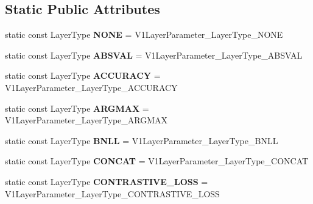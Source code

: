 \subsection*{Static Public Attributes}
\begin{DoxyCompactItemize}
\item 
\mbox{\label{classcaffe_1_1_v1_layer_parameter_a69f933852788ac4db6363f06117fe270}} 
static const Layer\+Type {\bfseries N\+O\+NE} = V1\+Layer\+Parameter\+\_\+\+Layer\+Type\+\_\+\+N\+O\+NE
\item 
\mbox{\label{classcaffe_1_1_v1_layer_parameter_a0ee0cb3758e99f1550ebe2dd50cfa107}} 
static const Layer\+Type {\bfseries A\+B\+S\+V\+AL} = V1\+Layer\+Parameter\+\_\+\+Layer\+Type\+\_\+\+A\+B\+S\+V\+AL
\item 
\mbox{\label{classcaffe_1_1_v1_layer_parameter_a4ec34d36a5a9a699792f5baa3f587473}} 
static const Layer\+Type {\bfseries A\+C\+C\+U\+R\+A\+CY} = V1\+Layer\+Parameter\+\_\+\+Layer\+Type\+\_\+\+A\+C\+C\+U\+R\+A\+CY
\item 
\mbox{\label{classcaffe_1_1_v1_layer_parameter_a5123d72bfb60d667c7dcdbe749778bf0}} 
static const Layer\+Type {\bfseries A\+R\+G\+M\+AX} = V1\+Layer\+Parameter\+\_\+\+Layer\+Type\+\_\+\+A\+R\+G\+M\+AX
\item 
\mbox{\label{classcaffe_1_1_v1_layer_parameter_a0aeb8326e13b304ed5091cde6f921540}} 
static const Layer\+Type {\bfseries B\+N\+LL} = V1\+Layer\+Parameter\+\_\+\+Layer\+Type\+\_\+\+B\+N\+LL
\item 
\mbox{\label{classcaffe_1_1_v1_layer_parameter_af74c24cc4c263d221f9a282b54dbd502}} 
static const Layer\+Type {\bfseries C\+O\+N\+C\+AT} = V1\+Layer\+Parameter\+\_\+\+Layer\+Type\+\_\+\+C\+O\+N\+C\+AT
\item 
\mbox{\label{classcaffe_1_1_v1_layer_parameter_ad0389e8238af342f1d21a4332fffa588}} 
static const Layer\+Type {\bfseries C\+O\+N\+T\+R\+A\+S\+T\+I\+V\+E\+\_\+\+L\+O\+SS} = V1\+Layer\+Parameter\+\_\+\+Layer\+Type\+\_\+\+C\+O\+N\+T\+R\+A\+S\+T\+I\+V\+E\+\_\+\+L\+O\+SS

\end{DoxyCompactItemize}
